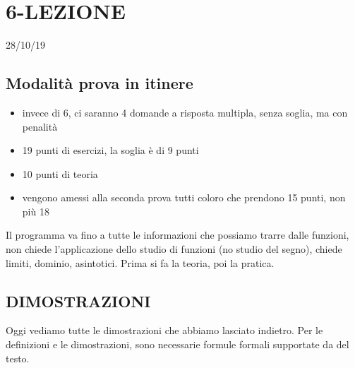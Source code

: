 \section*{6-LEZIONE}
28/10/19
\subsection*{Modalità prova in itinere}
\begin{itemize}
    \item invece di 6, ci saranno 4 domande a risposta multipla, senza soglia, ma con penalità
    \item 19 punti di esercizi, la soglia è di 9 punti
    \item 10 punti di teoria
    \item vengono amessi alla seconda prova tutti coloro che prendono 15 punti, non più 18
\end{itemize}
Il programma va fino a tutte le informazioni che possiamo trarre dalle funzioni, non chiede l'applicazione dello studio di funzioni (no studio del segno), chiede limiti, dominio, asintotici. Prima si fa la teoria, poi la pratica.
\newline
\newline
\subsection*{DIMOSTRAZIONI}
Oggi vediamo tutte le dimostrazioni che abbiamo lasciato indietro.
\newline
Per le definizioni e le dimostrazioni, sono necessarie formule formali supportate da del testo.
\newline
\newline
